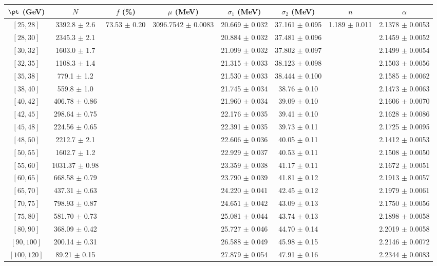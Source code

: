 \begin{tabular}{c||c|c|c|c|c|c|c}
$\pt$ (GeV) & $N$ & $f$ (\%) & $\mu$ (MeV) & $\sigma_1$ (MeV) & $\sigma_2$ (MeV) & $n$ & $\alpha$ \\
\hline
$[25, 28]$ & 3392.8 $\pm$ 2.6 & \multirow{19}{*}{73.53 $\pm$ 0.20} & \multirow{19}{*}{3096.7542 $\pm$ 0.0083} & 20.669 $\pm$ 0.032 & 37.161 $\pm$ 0.095 & \multirow{19}{*}{1.189 $\pm$ 0.011} & 2.1378 $\pm$ 0.0053\\
$[28, 30]$ & 2345.3 $\pm$ 2.1 &  &  & 20.884 $\pm$ 0.032 & 37.481 $\pm$ 0.096 &  & 2.1459 $\pm$ 0.0052\\
$[30, 32]$ & 1603.0 $\pm$ 1.7 &  &  & 21.099 $\pm$ 0.032 & 37.802 $\pm$ 0.097 &  & 2.1499 $\pm$ 0.0054\\
$[32, 35]$ & 1108.3 $\pm$ 1.4 &  &  & 21.315 $\pm$ 0.033 & 38.123 $\pm$ 0.098 &  & 2.1503 $\pm$ 0.0056\\
$[35, 38]$ & 779.1 $\pm$ 1.2 &  &  & 21.530 $\pm$ 0.033 & 38.444 $\pm$ 0.100 &  & 2.1585 $\pm$ 0.0062\\
$[38, 40]$ & 559.8 $\pm$ 1.0 &  &  & 21.745 $\pm$ 0.034 & 38.76 $\pm$ 0.10 &  & 2.1473 $\pm$ 0.0063\\
$[40, 42]$ & 406.78 $\pm$ 0.86 &  &  & 21.960 $\pm$ 0.034 & 39.09 $\pm$ 0.10 &  & 2.1606 $\pm$ 0.0070\\
$[42, 45]$ & 298.64 $\pm$ 0.75 &  &  & 22.176 $\pm$ 0.035 & 39.41 $\pm$ 0.10 &  & 2.1628 $\pm$ 0.0086\\
$[45, 48]$ & 224.56 $\pm$ 0.65 &  &  & 22.391 $\pm$ 0.035 & 39.73 $\pm$ 0.11 &  & 2.1725 $\pm$ 0.0095\\
$[48, 50]$ & 2212.7 $\pm$ 2.1 &  &  & 22.606 $\pm$ 0.036 & 40.05 $\pm$ 0.11 &  & 2.1412 $\pm$ 0.0053\\
$[50, 55]$ & 1602.7 $\pm$ 1.2 &  &  & 22.929 $\pm$ 0.037 & 40.53 $\pm$ 0.11 &  & 2.1508 $\pm$ 0.0050\\
$[55, 60]$ & 1031.37 $\pm$ 0.98 &  &  & 23.359 $\pm$ 0.038 & 41.17 $\pm$ 0.11 &  & 2.1672 $\pm$ 0.0051\\
$[60, 65]$ & 668.58 $\pm$ 0.79 &  &  & 23.790 $\pm$ 0.039 & 41.81 $\pm$ 0.12 &  & 2.1913 $\pm$ 0.0057\\
$[65, 70]$ & 437.31 $\pm$ 0.63 &  &  & 24.220 $\pm$ 0.041 & 42.45 $\pm$ 0.12 &  & 2.1979 $\pm$ 0.0061\\
$[70, 75]$ & 798.93 $\pm$ 0.87 &  &  & 24.651 $\pm$ 0.042 & 43.09 $\pm$ 0.13 &  & 2.1750 $\pm$ 0.0056\\
$[75, 80]$ & 581.70 $\pm$ 0.73 &  &  & 25.081 $\pm$ 0.044 & 43.74 $\pm$ 0.13 &  & 2.1898 $\pm$ 0.0058\\
$[80, 90]$ & 368.09 $\pm$ 0.42 &  &  & 25.727 $\pm$ 0.046 & 44.70 $\pm$ 0.14 &  & 2.2019 $\pm$ 0.0058\\
$[90, 100]$ & 200.14 $\pm$ 0.31 &  &  & 26.588 $\pm$ 0.049 & 45.98 $\pm$ 0.15 &  & 2.2146 $\pm$ 0.0072\\
$[100, 120]$ & 89.21 $\pm$ 0.15 &  &  & 27.879 $\pm$ 0.054 & 47.91 $\pm$ 0.16 &  & 2.2344 $\pm$ 0.0083\\
\end{tabular}
